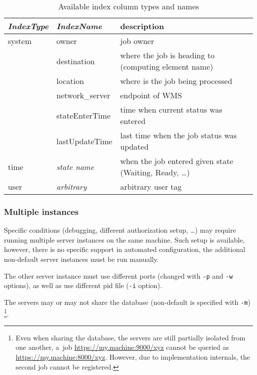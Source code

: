 \begin{table}
\begin{center}
\begin{tabularx}{.9\hsize}{|l|l|X|}
\hline
\emph{IndexType} & \emph{IndexName} & description \\
\hline
system & owner & job owner \\
 & destination & where the job is heading to (computing element name) \\
 & location & where is the job being processed \\
 & network\_server & endpoint of WMS \\
 & stateEnterTime & time when current status was entered \\
 & lastUpdateTime & last time when the job status was updated \\
\hline
time & \emph{state name} & when the job entered given state (Waiting, Ready, \dots) \\
\hline
user & \emph{arbitrary} & arbitrary user tag \\
\hline
\end{tabularx}
\end{center}
\caption{Available index column types and names}
\label{t:indexcols}
\end{table}


\subsubsection{Multiple instances}


Specific conditions (\eg debugging, different authorization setup, \dots)
may require running multiple \LB server instances
on the same machine.
Such setup is available, however, there is no specific support in automated
configuration, the additional non-default server instances must be run manually.

The other server instance must use different ports (changed with \verb'-p'
and \verb'-w' options), as well as use different pid file (\verb'-i' option).

The servers may or may not share the database (non-default is specified
with  \verb'-m')%
\footnote{Even when sharing the database, the servers are still 
partially isolated from
one another, \eg a~job \url{https://my.machine:9000/xyz} cannot be queried 
as \url{https://my.machine:8000/xyz}.
However, due to implementation internals, the second job cannot be registered.}.

